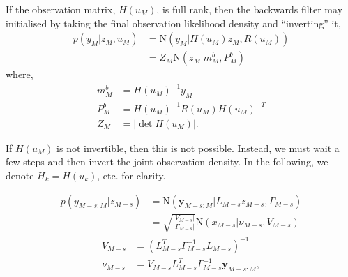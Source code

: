 \documentclass[twocolumn]{autart}    %
\begin{document}
If the observation matrix, $H(u_M)$, is full rank, then the backwards filter may initialised by taking the final observation likelihood density and ``inverting'' it,
%
\begin{equation}
\begin{split}
  p(y_M | z_M, u_M) &= \mathrm{N}( y_M | H(u_M) z_M , R(u_M) ) \\
  &= Z_M \mathrm{N}( z_M | m_M^b , P_M^b )
\end{split}
\end{equation}
%
where,
%
\begin{equation}
\begin{split}
  m_M^b &= H(u_M)^{-1} y_M \\
  P_M^b &= H(u_M)^{-1} R(u_M) H(u_M)^{-T} \\
  Z_M   &= |\det H(u_M)|     .
\end{split}
\end{equation}

If $H(u_M)$ is not invertible, then this is not possible. Instead, we must wait a few steps and then invert the joint observation density. In the following, we denote $H_k = H(u_k)$, etc. for clarity.

\begin{equation}
\begin{split}
 p(y_{M-s:M}|z_{M-s}) &= \mathrm{N}( \mathbf{y}_{M-s:M} | L_{M-s} z_{M-s}, \Gamma_{M-s} ) \\
 &= \sqrt{\frac{|V_{M-s}|}{|\Gamma_{M-s}|}} \mathrm{N}(x_{M-s} | \nu_{M-s}, V_{M-s} )
\end{split}
\end{equation}
\begin{equation}
\begin{split}
 V_{M-s} & = (L_{M-s}^T \Gamma_{M-s}^{-1} L_{M-s})^{-1} \\
 \nu_{M-s} & = V_{M-s} L_{M-s}^T \Gamma_{M-s}^{-1} \mathbf{y}_{M-s:M}     ,
\end{split}
\end{equation}
\end{document}
